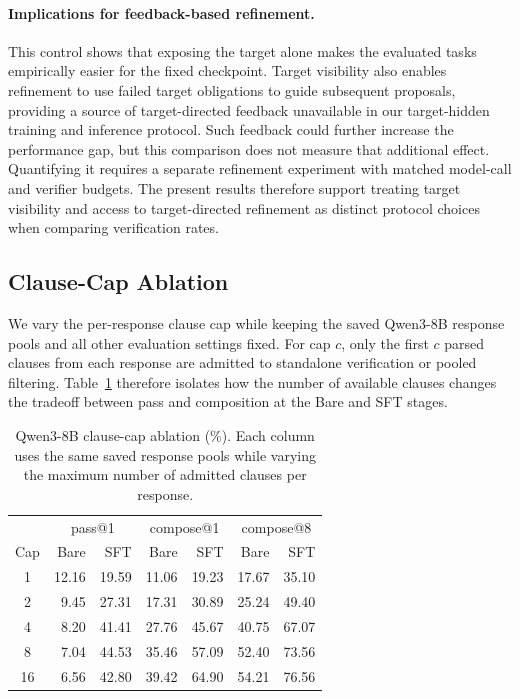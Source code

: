 \paragraph{Implications for feedback-based refinement.}
This control shows that exposing the target alone makes the evaluated tasks
empirically easier for the fixed checkpoint.  Target visibility also enables
refinement to use failed target obligations to guide subsequent proposals,
providing a source of target-directed feedback unavailable in our target-hidden
training and inference protocol.  Such feedback could further increase the
performance gap, but this comparison does not measure that additional effect.
Quantifying it requires a separate refinement experiment with matched model-call
and verifier budgets.  The present results therefore support treating target
visibility and access to target-directed refinement as distinct protocol
choices when comparing verification rates.

\subsection{Clause-Cap Ablation}
\label{app:clause-cap}

We vary the per-response clause cap while keeping the saved Qwen3-8B response
pools and all other evaluation settings fixed.  For cap \(c\), only the first
\(c\) parsed clauses from each response are admitted to standalone verification
or pooled filtering.  Table~\ref{tab:clause-cap-ablation} therefore isolates
how the number of available clauses changes the tradeoff between pass and
composition at the Bare and SFT stages.

\begin{table}[H]
\centering
\small
\setlength{\tabcolsep}{3.2pt}
\caption{Qwen3-8B clause-cap ablation (\%).  Each column uses the same saved
  response pools while varying the maximum number of admitted clauses per
  response.}
\label{tab:clause-cap-ablation}
\begin{tabular}{crrrrrr}
\toprule
\rowcolor{algobg}
& \multicolumn{2}{c}{pass@1} & \multicolumn{2}{c}{compose@1}
& \multicolumn{2}{c}{compose@8} \\
\headercmidrules{\cmidrule(lr){2-3}\cmidrule(lr){4-5}\cmidrule(lr){6-7}}
\rowcolor{algobg}
Cap & Bare & SFT & Bare & SFT & Bare & SFT \\
\midrule
1 & 12.16 & 19.59 & 11.06 & 19.23 & 17.67 & 35.10 \\
2 & 9.45 & 27.31 & 17.31 & 30.89 & 25.24 & 49.40 \\
4 & 8.20 & 41.41 & 27.76 & 45.67 & 40.75 & 67.07 \\
8 & 7.04 & 44.53 & 35.46 & 57.09 & 52.40 & 73.56 \\
16 & 6.56 & 42.80 & 39.42 & 64.90 & 54.21 & 76.56 \\
\bottomrule
\end{tabular}
\end{table}

